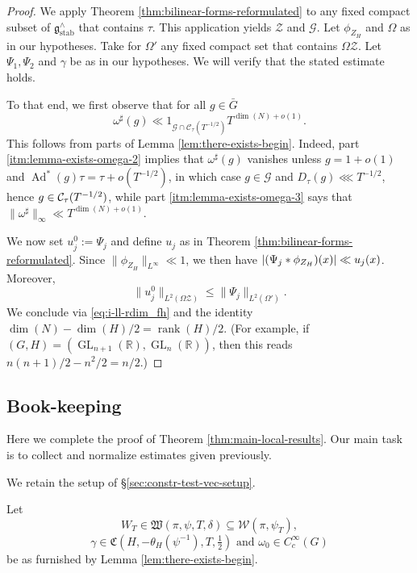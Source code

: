 \documentclass[reqno]{amsart}
\DeclarePairedDelimiter{\paren}{(}{)}
\DeclarePairedDelimiter{\abs}{\lvert}{\rvert}
\DeclareMathOperator{\GL}{GL}
\DeclareMathOperator{\Ad}{Ad}
\DeclareMathOperator{\stab}{stab}
\DeclareMathOperator{\rank}{rank}
\theoremstyle{plain} \newtheorem{theorem} {Theorem}
\theoremstyle{definition} \newtheorem{definition} [theorem] {Definition}
\theoremstyle{itplain} %
\numberwithin{equation}{section}
\numberwithin{theorem}{section}
\renewcommand{\leq}{\leqslant}
\begin{document}
\begin{proof}
  We apply Theorem \ref{thm:bilinear-forms-reformulated} to any fixed compact subset of $\mathfrak{g}^\wedge_{\stab}$ that contains $\tau$.  This application yields $\mathcal{Z}$ and $\mathcal{G}$.  Let $\phi_{Z_H}$ and $\Omega$ as in our hypotheses.  Take for $\Omega '$ any fixed compact set that contains $\Omega \mathcal{Z}$.  Let $\Psi_1, \Psi_2$ and $\gamma$ be as in our hypotheses.  We will verify that the stated estimate holds.

  To that end, we first observe that for all $g \in \bar{G}$
  \begin{equation*}
    \omega^\sharp(g) \ll
    1_{\mathcal{G} \cap \mathcal{C}_\tau(T^{-1/2})}     T^{\dim(N) + o(1)}.
  \end{equation*}
  This follows from parts of Lemma \ref{lem:there-exists-begin}.  Indeed, part \eqref{itm:lemma-exists-omega-2} implies that $\omega ^\sharp(g)$ vanishes unless $g = 1 + o(1)$ and $\Ad^*(g) \tau = \tau + o(T^{-1/2})$, in which case $g \in \mathcal{G}$ and $D_\tau(g) \lll T^{-1/2}$, hence $g \in \mathcal{C}_\tau\paren{T^{-1/2}}$, while part \eqref{itm:lemma-exists-omega-3} says that $\|\omega^\sharp\|_{\infty} \ll T^{\dim(N)+o(1)}$.

  We now set $u_j^0 := \Psi_j$ and define $u_j$ as in Theorem \ref{thm:bilinear-forms-reformulated}.  Since $\lVert \phi_{Z_H} \rVert_{L^\infty} \ll 1$, we then have $\abs{ \paren{\Psi_j \ast \phi_{Z_H}}(x) } \ll u_j(x)$.  Moreover,
  \begin{equation*}
    \lVert u_j^0 \rVert_{L^2(\Omega \mathcal{Z})} \leq \lVert \Psi_j \rVert_{L^2(\Omega ')}.
  \end{equation*}
  We conclude via \eqref{eq:i-ll-rdim_fh} and the identity $\dim(N) - \dim(H)/2 = \rank(H)/2$.  (For example, if $(G,H) = (\GL_{n+1}(\mathbb{R}), \GL_n(\mathbb{R}))$, then this reads $n(n+1)/2 - n^2/2 = n/2$.)
\end{proof}




\subsection{Book-keeping}\label{sec:book-keeping}
Here we complete the proof of Theorem \ref{thm:main-local-results}.  Our main task is to collect and normalize estimates given previously.

We retain the setup of \S\ref{sec:constr-test-vec-setup}.

Let
\begin{equation*}
W_T \in \mathfrak{W}(\pi,\psi,T,\delta) \subseteq \mathcal{W}(\pi,\psi_T),
\end{equation*}
\begin{equation*}
\gamma \in \mathfrak{C}(H,-\theta_H(\psi^{-1}),T,\tfrac{1}{2})  \text{ and }  \omega_0 \in C_c^\infty(G)
\end{equation*}
be as furnished by Lemma \ref{lem:there-exists-begin}.
\end{document}
